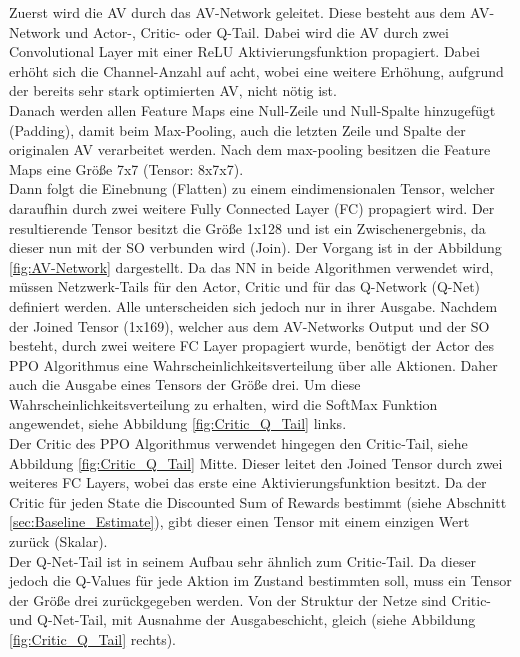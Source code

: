 Zuerst wird die AV durch das AV-Network geleitet. Diese besteht aus dem AV-Network und Actor-, Critic- oder Q-Tail.
Dabei wird die AV durch zwei Convolutional Layer mit einer ReLU Aktivierungsfunktion propagiert. Dabei erhöht sich die Channel-Anzahl auf acht, wobei eine weitere Erhöhung, aufgrund der bereits sehr stark optimierten AV, nicht nötig ist.\\  
Danach werden allen Feature Maps eine Null-Zeile und Null-Spalte hinzugefügt (Padding), damit beim Max-Pooling, auch die letzten Zeile und Spalte der originalen AV verarbeitet werden. Nach dem max-pooling besitzen die Feature Maps eine Größe 7x7 (Tensor: 8x7x7).\\ 
Dann folgt die Einebnung (Flatten) zu einem eindimensionalen Tensor, welcher daraufhin durch zwei weitere Fully Connected Layer (FC) propagiert wird. Der resultierende Tensor besitzt die Größe 1x128 und ist ein Zwischenergebnis, da dieser nun mit der SO verbunden wird (Join). Der Vorgang ist in der Abbildung \ref{fig:AV-Network} dargestellt.
Da das NN in beide Algorithmen verwendet wird, müssen Netzwerk-Tails für den Actor, Critic und für das Q-Network (Q-Net) definiert werden. Alle unterscheiden sich jedoch nur in ihrer Ausgabe. 
Nachdem der Joined Tensor (1x169), welcher aus dem AV-Networks Output und der SO besteht, durch zwei weitere FC Layer propagiert wurde, benötigt der Actor des PPO Algorithmus eine Wahrscheinlichkeitsverteilung über alle Aktionen. Daher auch die Ausgabe eines Tensors der Größe drei. Um diese Wahrscheinlichkeitsverteilung zu erhalten, wird die SoftMax Funktion angewendet, siehe Abbildung \ref{fig:Critic_Q_Tail} links.\\
Der Critic des PPO Algorithmus verwendet hingegen den Critic-Tail, siehe Abbildung \ref{fig:Critic_Q_Tail} Mitte. Dieser leitet den Joined Tensor durch zwei weiteres FC Layers, wobei das erste eine Aktivierungsfunktion besitzt. Da der Critic für jeden State die Discounted Sum of Rewards bestimmt (siehe Abschnitt \ref{sec:Baseline_Estimate}), gibt dieser einen Tensor mit einem einzigen Wert zurück (Skalar).\\
Der Q-Net-Tail ist in seinem Aufbau sehr ähnlich zum Critic-Tail. Da dieser jedoch die Q-Values für jede Aktion im Zustand bestimmten soll, muss ein Tensor der Größe drei zurückgegeben werden. Von der Struktur der Netze sind Critic- und Q-Net-Tail, mit Ausnahme der Ausgabeschicht, gleich (siehe Abbildung \ref{fig:Critic_Q_Tail} rechts).
